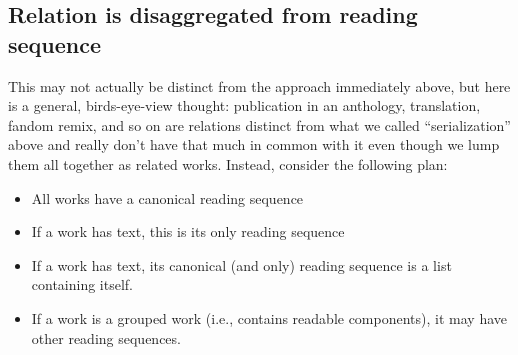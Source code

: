 \documentclass{amsart}
\theoremstyle{remark}
\begin{document}
\subsection{Relation is disaggregated from reading sequence}
This may not actually be distinct from the approach immediately above, but here is a general, birds-eye-view thought: publication in an anthology, translation, fandom remix, and so on are relations distinct from what we called ``serialization'' above and really don't have that much in common with it even though we lump them all together as related works. Instead, consider the following plan: 
\begin{itemize}
\item All works have a canonical reading sequence
\item If a work has text, this is its only reading sequence
\item If a work has text, its canonical (and only) reading sequence is a list containing itself.
\item If a work is a grouped work (i.e., contains readable components), it may have other reading sequences.
\end{itemize}
\end{document}
